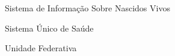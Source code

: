 \begin{siglas}
    \item [SINASC] Sistema de Informação Sobre Nascidos Vivos
    \item [SUS] Sistema Único de Saúde 
    \item [UF] Unidade Federativa
\end{siglas}
    
    